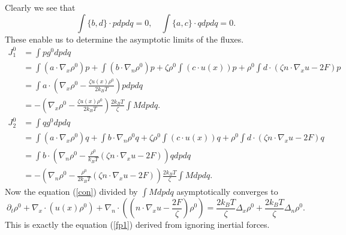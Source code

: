 \documentclass[reqno]{amsart}
\numberwithin{equation}{section}
\theoremstyle{definition}
\theoremstyle{remark}
\begin{document}
Clearly we see that
$$
\int \{b, d\}\cdot pdpdq=0, \quad \int \{a, c\}\cdot qdpdq=0.
$$
These enable us to determine the asymptotic limits of the fluxes.
\begin{align*}
J_1^0 &= \int pg^0 dpdq \\
& = \int (a\cdot\nabla_x \rho^0) p  +\int (b\cdot \nabla_n \rho^0 )p +
\zeta  \rho^0 \int (c \cdot u(x)) p
+\rho^0 \int d\cdot (\zeta n \cdot  \nabla_x u-2F)p\\
& =\int a\cdot \left(\nabla_x \rho^0- \frac{\zeta u(x)\rho^0}{2k_B T} \right) p dpdq \\
& =-\left(\nabla_x \rho^0- \frac{\zeta u(x)\rho^0}{2k_B T} \right)\frac{2k_B T}{\zeta}\int Mdpdq.
\end{align*}
\begin{align*}
J_2^0 &= \int qg^0 dpdq \\
& = \int (a\cdot \nabla_x \rho^0)q  +\int b\cdot \nabla_n \rho^0  q + \zeta \rho^0 \int (c \cdot u(x)) q
+\rho^0 \int d\cdot (\zeta n\cdot \nabla_x u-2F) q\\
& =\int b \cdot\left(\nabla_n \rho^0- \frac{\rho^0}{k_B T}(\zeta n\cdot \nabla_x u-2F) \right) q dpdq \\
& = -\left(\nabla_n \rho^0- \frac{\rho^0}{2k_B T}(\zeta n\cdot \nabla_x u-2F) \right) \frac{2k_B T }{\zeta}\int Mdpdq.
\end{align*}
Now the equation (\ref{con}) divided  by $\int Mdpdq$  asymptotically converges to
$$
\partial_t \rho^0 + \nabla_x\cdot(u(x)\rho^0) +\nabla_n \cdot ((n\cdot \nabla_x u-\frac{2F}{\zeta})\rho^0)
= \frac{2k_BT}{\zeta}\Delta_x \rho^0 +\frac{2k_BT}{\zeta}\Delta_n \rho^0.
$$
This is exactly the equation (\ref{fp1}) derived from ignoring inertial forces.
\end{document}
